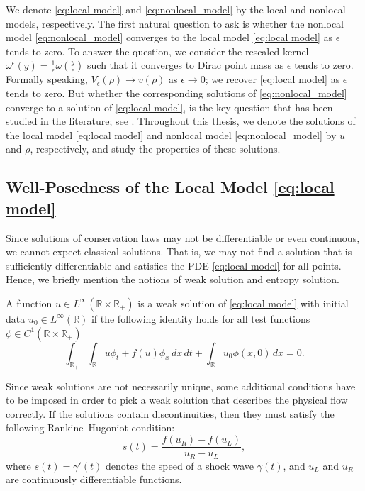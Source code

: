 We denote \eqref{eq:local model} and \eqref{eq:nonlocal_model} by the local and nonlocal models, respectively. The first natural question to ask is whether the nonlocal model \eqref{eq:nonlocal_model} converges to the local model \eqref{eq:local model} as $\epsilon$ tends to zero. To answer the question, we consider the rescaled kernel $\omega^{\epsilon}(y) = \frac{1}{\epsilon} \omega(\tfrac{y}{\epsilon})$ such that it converges to Dirac point mass as $\epsilon$ tends to zero. Formally speaking, $V_{\epsilon}(\rho) \rightarrow v(\rho)$ as $\epsilon \rightarrow 0$; we recover \eqref{eq:local model} as $\epsilon$ tends to zero. But whether the corresponding solutions of \eqref{eq:nonlocal_model} converge to a solution of \eqref{eq:local model}, is the key question that has been studied in the literature; see \cite{bressanEntropyAdmissibilityLimit2021,colomboLocalLimitNonlocal2021,cocliteGeneralResultApproximation2022, huangAsymptoticCompatibilityClass2024,nittiAsymptoticallyCompatibleEntropyconsistent2025}.
Throughout this thesis, we denote the solutions of the local model \eqref{eq:local model} and nonlocal model \eqref{eq:nonlocal_model} by $u$ and $\rho$, respectively, and study the properties of these solutions.

\subsection{Well-Posedness of the Local Model \eqref{eq:local model}}
Since solutions of conservation laws may not be differentiable or even continuous, we cannot expect classical solutions. That is, we may not find a solution that is sufficiently differentiable and satisfies the PDE \eqref{eq:local model} for all points. Hence, we briefly mention the notions of weak solution and entropy solution.

\begin{definition}
    A function $u \in L^{\infty}(\mathbb{R} \times \mathbb{R_{+}})$ is a weak solution of \eqref{eq:local model} with initial
    data $u_{0} \in L^{\infty}(\mathbb{R})$ if the following identity holds for all test functions $\phi \in C^{1}(\mathbb{R} \times \mathbb{R_{+}})$
    \begin{equation}\label{eq:weak condition}
        \int_{\mathbb{R_{+}}}^{} \int_{\mathbb{R}}^{} {
            u \phi_{t} + f(u) \phi_{x} \,dx \, dt
        }
        + \int_{\mathbb{R}}^{} u_{0} \phi(x,0) \,dx = 0.
    \end{equation}
\end{definition}
Since weak solutions are not necessarily unique, some additional conditions have to be imposed in order to pick a weak solution that describes the physical flow correctly. If the solutions contain discontinuities, then they must satisfy the following Rankine--Hugoniot condition:
\begin{equation}\label{eq:R_H}
    s(t) = \frac{f(u_R)- f(u_L)}{u_R- u_L},
\end{equation}
where $s(t)= \gamma'(t)$ denotes the speed of a shock wave $\gamma(t)$, and $u_L$ and $u_R$ are continuously differentiable functions.


